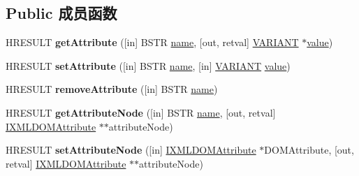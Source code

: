 \subsection*{Public 成员函数}
\begin{DoxyCompactItemize}
\item 
\mbox{\label{interface_i_x_m_l_d_o_m_element_aa1125ad5ce3cba7d613690b8a0b5ae1a}} 
H\+R\+E\+S\+U\+LT {\bfseries get\+Attribute} (\mbox{[}in\mbox{]} B\+S\+TR \hyperlink{structname}{name}, \mbox{[}out, retval\mbox{]} \hyperlink{structtag_v_a_r_i_a_n_t}{V\+A\+R\+I\+A\+NT} $\ast$\hyperlink{unionvalue}{value})
\item 
\mbox{\label{interface_i_x_m_l_d_o_m_element_a7f207b02578c6856022174d829401c51}} 
H\+R\+E\+S\+U\+LT {\bfseries set\+Attribute} (\mbox{[}in\mbox{]} B\+S\+TR \hyperlink{structname}{name}, \mbox{[}in\mbox{]} \hyperlink{structtag_v_a_r_i_a_n_t}{V\+A\+R\+I\+A\+NT} \hyperlink{unionvalue}{value})
\item 
\mbox{\label{interface_i_x_m_l_d_o_m_element_a38aff2bd10a5329181e72328a39c1c1d}} 
H\+R\+E\+S\+U\+LT {\bfseries remove\+Attribute} (\mbox{[}in\mbox{]} B\+S\+TR \hyperlink{structname}{name})
\item 
\mbox{\label{interface_i_x_m_l_d_o_m_element_af98a02907bc3ff2ecdf97e1fd7c57e89}} 
H\+R\+E\+S\+U\+LT {\bfseries get\+Attribute\+Node} (\mbox{[}in\mbox{]} B\+S\+TR \hyperlink{structname}{name}, \mbox{[}out, retval\mbox{]} \hyperlink{interface_i_x_m_l_d_o_m_attribute}{I\+X\+M\+L\+D\+O\+M\+Attribute} $\ast$$\ast$attribute\+Node)
\item 
\mbox{\label{interface_i_x_m_l_d_o_m_element_aa33fbaa3455ce2a329fd17def01c1d7b}} 
H\+R\+E\+S\+U\+LT {\bfseries set\+Attribute\+Node} (\mbox{[}in\mbox{]} \hyperlink{interface_i_x_m_l_d_o_m_attribute}{I\+X\+M\+L\+D\+O\+M\+Attribute} $\ast$D\+O\+M\+Attribute, \mbox{[}out, retval\mbox{]} \hyperlink{interface_i_x_m_l_d_o_m_attribute}{I\+X\+M\+L\+D\+O\+M\+Attribute} $\ast$$\ast$attribute\+Node)
\item 
\mbox{\label{interface_i_x_m_l_d_o_m_element_ab8c6fd7204619110ddefd3ef3d4ce298}} 

\end{DoxyCompactItemize}
